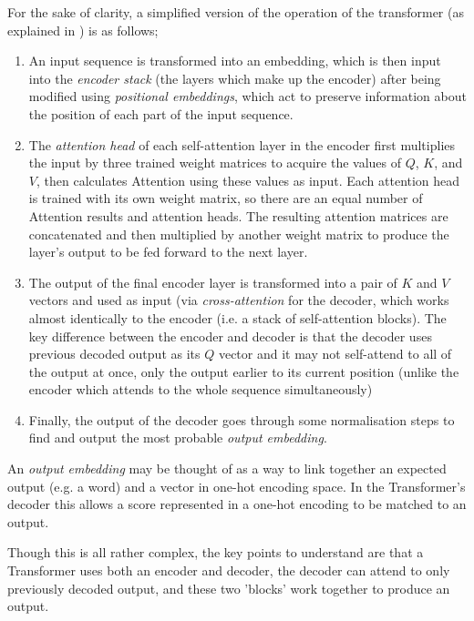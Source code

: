 For the sake of clarity, a simplified version of the operation of the transformer (as explained in \cite{vaswani2017attention}) is as follows;

\begin{enumerate}
        \item An input sequence is transformed into an embedding, which is then input into the \emph{encoder stack} (the layers which make up the encoder) after being modified using \emph{positional embeddings}, which act to preserve information about the position of each part of the input sequence.
        \item The \emph{attention head} of each self-attention layer in the encoder first multiplies the input by three trained weight matrices to acquire the values of $Q$, $K$, and $V$, then calculates Attention using these values as input.
        Each attention head is trained with its own weight matrix, so there are an equal number of Attention results and attention heads.
        The resulting attention matrices are concatenated and then multiplied by another weight matrix to produce the layer's output to be fed forward to the next layer.
        \item The output of the final encoder layer is transformed into a pair of $K$ and $V$ vectors and used as input (via \emph{cross-attention} for the decoder, which works almost identically to the encoder (i.e. a stack of self-attention blocks).
        The key difference between the encoder and decoder is that the decoder uses previous decoded output as its $Q$ vector and it may not self-attend to all of the output at once, only the output earlier to its current position (unlike the encoder which attends to the whole sequence simultaneously)
        \item Finally, the output of the decoder goes through some normalisation steps to find and output the most probable \emph{output embedding}.
\end{enumerate}

An \emph{output embedding} may be thought of as a way to link together an expected output (e.g. a word) and a vector in one-hot encoding space.
In the Transformer's decoder this allows a score represented in a one-hot encoding to be matched to an output.

Though this is all rather complex, the key points to understand are that a Transformer uses both an encoder and decoder, the decoder can attend to only previously decoded output, and these two 'blocks' work together to produce an output.

